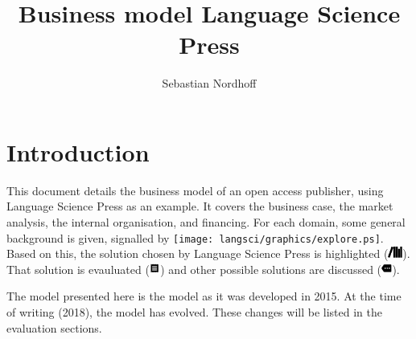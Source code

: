 \documentclass[output=guidelines,draftmode]{langscibook}
\title{Business model Language Science Press}
\author{Sebastian Nordhoff}
\begin{document}
\maketitle
\tableofcontents
\mainmatter
\chapter{Introduction}
This document details the business model of an open access publisher, using Language Science Press as an example. It covers the
business case,
the market analysis, 
the internal organisation, 
and financing. 
For each domain, some general background is given, signalled by {\color{yellow}\texttt{[image: langsci/graphics/explore.ps]}}.
Based on this, the solution chosen by Language Science Press is highlighted ({\color{lsLightBlue}\includegraphics[height=1em]{langsci/graphics/tbls-langsci.pdf}}).
That solution is evauluated ({\color{lsLightOrange}\includegraphics[height=1em]{langsci/graphics/tbls-receipt.pdf}})
and other possible solutions are discussed ({\color{lsDarkGreenOne}\includegraphics[height=1em]{langsci/graphics/tbls-more.pdf}}). 

The model presented here is the model as it was developed in 2015. At the time of writing (2018), the model has evolved. These changes will be listed in the evaluation sections. 
\end{document}

